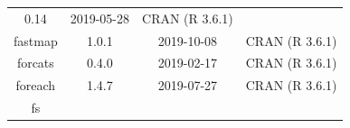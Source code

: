 \documentclass[11pt,]{book}
\begin{document}
\begin{longtable}[]{@{}cccc@{}}
\begin{minipage}[t]{0.19\columnwidth}
0.14\strut
\end{minipage} & \begin{minipage}[t]{0.16\columnwidth}\centering\strut
2019-05-28\strut
\end{minipage} & \begin{minipage}[t]{0.36\columnwidth}\centering\strut
CRAN (R 3.6.1)\strut
\end{minipage}\tabularnewline
\begin{minipage}[t]{0.18\columnwidth}\centering\strut
fastmap\strut
\end{minipage} & \begin{minipage}[t]{0.19\columnwidth}\centering\strut
1.0.1\strut
\end{minipage} & \begin{minipage}[t]{0.16\columnwidth}\centering\strut
2019-10-08\strut
\end{minipage} & \begin{minipage}[t]{0.36\columnwidth}\centering\strut
CRAN (R 3.6.1)\strut
\end{minipage}\tabularnewline
\begin{minipage}[t]{0.18\columnwidth}\centering\strut
forcats\strut
\end{minipage} & \begin{minipage}[t]{0.19\columnwidth}\centering\strut
0.4.0\strut
\end{minipage} & \begin{minipage}[t]{0.16\columnwidth}\centering\strut
2019-02-17\strut
\end{minipage} & \begin{minipage}[t]{0.36\columnwidth}\centering\strut
CRAN (R 3.6.1)\strut
\end{minipage}\tabularnewline
\begin{minipage}[t]{0.18\columnwidth}\centering\strut
foreach\strut
\end{minipage} & \begin{minipage}[t]{0.19\columnwidth}\centering\strut
1.4.7\strut
\end{minipage} & \begin{minipage}[t]{0.16\columnwidth}\centering\strut
2019-07-27\strut
\end{minipage} & \begin{minipage}[t]{0.36\columnwidth}\centering\strut
CRAN (R 3.6.1)\strut
\end{minipage}\tabularnewline
\begin{minipage}[t]{0.18\columnwidth}\centering\strut
fs\strut
\end{minipage} & \begin{minipage}[t]{0.19\columnwidth}\centering\strut

\end{minipage}
\end{longtable}
\end{document}
